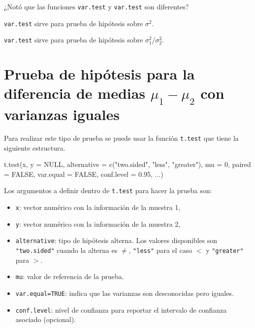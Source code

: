 \documentclass[
]{book}
\makeatletter
\newenvironment{Shaded}{\begin{snugshade}}{\end{snugshade}}
\newcommand{\AttributeTok}[1]{\textcolor[rgb]{0.77,0.63,0.00}{#1}}
\newcommand{\ConstantTok}[1]{\textcolor[rgb]{0.00,0.00,0.00}{#1}}
\newcommand{\DecValTok}[1]{\textcolor[rgb]{0.00,0.00,0.81}{#1}}
\newcommand{\FloatTok}[1]{\textcolor[rgb]{0.00,0.00,0.81}{#1}}
\newcommand{\FunctionTok}[1]{\textcolor[rgb]{0.00,0.00,0.00}{#1}}
\newcommand{\NormalTok}[1]{#1}
\newcommand{\StringTok}[1]{\textcolor[rgb]{0.31,0.60,0.02}{#1}}
\providecommand{\tightlist}{%
  \setlength{\itemsep}{0pt}\setlength{\parskip}{0pt}}
\newenvironment{kframe}{%
\medskip{}
\setlength{\fboxsep}{.8em}
 \def\at@end@of@kframe{}%
 \ifinner\ifhmode%
  \def\at@end@of@kframe{\end{minipage}}%
  \begin{minipage}{\columnwidth}%
 \fi\fi%
 \def\FrameCommand##1{\hskip\@totalleftmargin \hskip-\fboxsep
 \colorbox{shadecolor}{##1}\hskip-\fboxsep
     \hskip-\linewidth \hskip-\@totalleftmargin \hskip\columnwidth}%
 \MakeFramed {\advance\hsize-\width
   \@totalleftmargin\z@ \linewidth\hsize
   \@setminipage}}%
 {\par\unskip\endMakeFramed%
 \at@end@of@kframe}
\renewenvironment{Shaded}{\begin{kframe}}{\end{kframe}}
\newenvironment{rmdblock}[1]
  {
  \begin{itemize}
  \renewcommand{\labelitemi}{
    \raisebox{-.7\height}[0pt][0pt]{
      {\setkeys{Gin}{width=3em,keepaspectratio}\texttt{[image: images/\#1]}}
    }
  }
  \setlength{\fboxsep}{1em}
  \begin{kframe}
  \item
  }
  {
  \end{kframe}
  \end{itemize}
  }
\newenvironment{rmdwarning}
  {\begin{rmdblock}{warning}}
  {\end{rmdblock}}
\makeatother
\begin{document}
\begin{rmdwarning}
¿Notó que las funciones \texttt{var.test} y \texttt{var.test} son diferentes?

\texttt{var.test} sirve para prueba de hipótesis sobre \(\sigma^2\).

\texttt{var.test} sirve para prueba de hipótesis sobre \(\sigma_1^2 / \sigma_2^2\).
\end{rmdwarning}

\hypertarget{prueba-de-hipuxf3tesis-para-la-diferencia-de-medias-mu_1-mu_2-con-varianzas-iguales}{%
\section{\texorpdfstring{Prueba de hipótesis para la diferencia de medias \(\mu_1-\mu_2\) con varianzas iguales}{Prueba de hipótesis para la diferencia de medias \textbackslash mu\_1-\textbackslash mu\_2 con varianzas iguales}}\label{prueba-de-hipuxf3tesis-para-la-diferencia-de-medias-mu_1-mu_2-con-varianzas-iguales}}

Para realizar este tipo de prueba se puede usar la función \texttt{t.test} que tiene la siguiente estructura.

\begin{Shaded}
\begin{Highlighting}[]
\FunctionTok{t.test}\NormalTok{(x, }\AttributeTok{y =} \ConstantTok{NULL}\NormalTok{,}
       \AttributeTok{alternative =} \FunctionTok{c}\NormalTok{(}\StringTok{"two.sided"}\NormalTok{, }\StringTok{"less"}\NormalTok{, }\StringTok{"greater"}\NormalTok{),}
       \AttributeTok{mu =} \DecValTok{0}\NormalTok{, }\AttributeTok{paired =} \ConstantTok{FALSE}\NormalTok{, }\AttributeTok{var.equal =} \ConstantTok{FALSE}\NormalTok{,}
       \AttributeTok{conf.level =} \FloatTok{0.95}\NormalTok{, ...)}
\end{Highlighting}
\end{Shaded}

Los argumentos a definir dentro de \texttt{t.test} para hacer la prueba son:

\begin{itemize}
\tightlist
\item
  \texttt{x}: vector numérico con la información de la muestra 1,
\item
  \texttt{y}: vector numérico con la información de la muestra 2,
\item
  \texttt{alternative}: tipo de hipótesis alterna. Los valores disponibles son \texttt{"two.sided"} cuando la alterna es \(\neq\), \texttt{"less"} para el caso \(<\) y \texttt{"greater"} para \(>\).
\item
  \texttt{mu}: valor de referencia de la prueba.
\item
  \texttt{var.equal=TRUE}: indica que las varianzas son desconocidas pero iguales.
\item
  \texttt{conf.level}: nivel de confianza para reportar el intervalo de confianza asociado (opcional).
\end{itemize}
\end{document}
